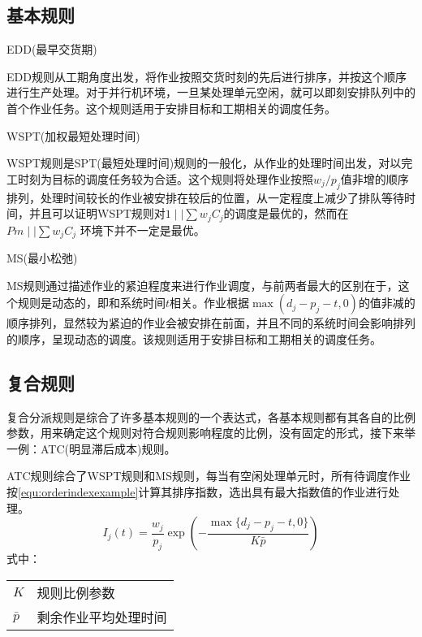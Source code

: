 \subsection{基本规则}
\begin{asparaenum}
\item EDD(最早交货期)

EDD规则从工期角度出发，将作业按照交货时刻的先后进行排序，并按这个顺序进行生产处理。对于并行机环境，一旦某处理单元空闲，就可以即刻安排队列中的首个作业任务。这个规则适用于安排目标和工期相关的调度任务。
\item WSPT(加权最短处理时间)

WSPT规则是SPT(最短处理时间)规则的一般化，从作业的处理时间出发，对以完工时刻为目标的调度任务较为合适。这个规则将处理作业按照$w_j/p_j$值非增的顺序排列，处理时间较长的作业被安排在较后的位置，从一定程度上减少了排队等待时间，并且可以证明WSPT规则对$1\mid \mid \sum w_jC_j$的调度是最优的\cite{pinedo}，然而在$Pm \mid \mid \sum w_jC_j$ 环境下并不一定是最优。

\item MS(最小松弛)
\end{asparaenum}

MS规则通过描述作业的紧迫程度来进行作业调度，与前两者最大的区别在于，这个规则是动态的，即和系统时间$t$相关。作业根据$\max (d_j - p_j - t , 0)$的值非减的顺序排列，显然较为紧迫的作业会被安排在前面，并且不同的系统时间会影响排列的顺序，呈现动态的调度。该规则适用于安排目标和工期相关的调度任务。
\subsection{复合规则}
复合分派规则是综合了许多基本规则的一个表达式，各基本规则都有其各自的比例参数，用来确定这个规则对符合规则影响程度的比例，没有固定的形式，接下来举一例：ATC(明显滞后成本)规则。

ATC规则综合了WSPT规则和MS规则，每当有空闲处理单元时，所有待调度作业按\eqref{equ:orderindexexample}计算其排序指数，选出具有最大指数值的作业进行处理。
\begin{equation}
I_j(t) = \frac{w_j}{p_j}\exp\left(-\frac{\max\{d_j - p_j - t, 0\}}{K\bar p}\right) \label{equ:orderindexexample}
\end{equation}
式中：

\begin{tabular}{ll}
$K$ & 规则比例参数\\
$\bar p$ &剩余作业平均处理时间
\end{tabular}


